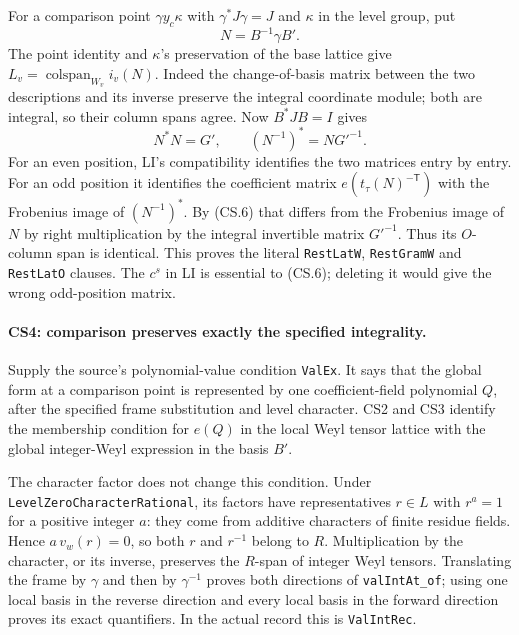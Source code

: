\documentclass[11pt,a4paper]{article}
\numberwithin{equation}{section}
\theoremstyle{remark}\newtheorem{remark}[theorem]{Remark}
\begin{document}
For a comparison point $\gamma y_c\kappa$ with $\gamma^*J\gamma=J$
and $\kappa$ in the level group, put
\[
 N=B^{-1}\gamma B'.
\]
The point identity and $\kappa$'s preservation of the base lattice give
$L_v=\operatorname{colspan}_{W_v}i_v(N)$.
Indeed the change-of-basis matrix between the two descriptions and its
inverse preserve the integral coordinate module; both are integral,
so their column spans agree. Now $B^*JB=I$ gives
\[
 N^*N=G',\qquad (N^{-1})^*=NG'^{-1}.                    \tag{CS.6}
\]
For an even position, LI's compatibility identifies the two matrices
entry by entry. For an odd position it identifies the coefficient
matrix $e(t_\tau(N)^{-\mathsf T})$ with the Frobenius image of
$(N^{-1})^*$. By (CS.6) that differs from the Frobenius image of $N$
by right multiplication by the integral invertible matrix $G'^{-1}$.
Thus its $O$-column span is identical. This proves the literal
\texttt{RestLatW}, \texttt{RestGramW} and \texttt{RestLatO} clauses.
The $c^s$ in LI is essential to (CS.6); deleting it would give the
wrong odd-position matrix.

\paragraph{CS4: comparison preserves exactly the specified integrality.}
Supply the source's polynomial-value condition \texttt{ValEx}.
It says that the global form at a comparison point is represented by
one coefficient-field polynomial $Q$, after the specified frame
substitution and level character. CS2 and CS3 identify the membership
condition for $e(Q)$ in the local Weyl tensor lattice with the global
integer-Weyl expression in the basis $B'$.

The character factor does not change this condition. Under
\texttt{LevelZeroCharacterRational}, its factors have representatives
$r\in L$ with $r^a=1$ for a positive integer $a$: they come from
additive characters of finite residue fields. Hence
$a\,v_w(r)=0$, so both $r$ and $r^{-1}$ belong to $R$.
Multiplication by the character, or its inverse, preserves the
$R$-span of integer Weyl tensors. Translating the frame by
$\gamma$ and then by $\gamma^{-1}$ proves both directions of
\texttt{valIntAt\_of}; using one local basis in the reverse direction
and every local basis in the forward direction proves its exact
quantifiers. In the actual record this is \texttt{ValIntRec}.
\end{document}
